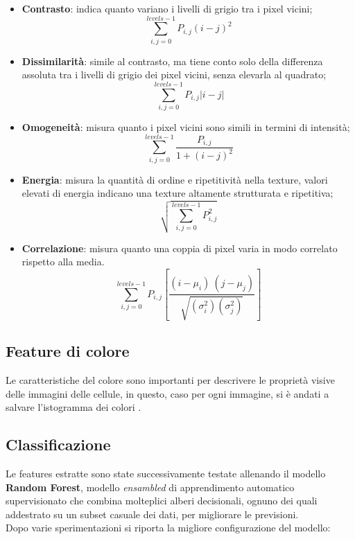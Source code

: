 \documentclass[italian,10pt,a4paper]{article}
\begin{document}
					\begin{itemize}
						
						\item \textbf{Contrasto}: indica quanto variano i livelli di grigio tra i pixel vicini; $$\sum_{i,j=0}^{levels-1} P_{i,j}(i-j)^2$$
						
						\item \textbf{Dissimilarità}: simile al contrasto, ma tiene conto solo della differenza assoluta tra i livelli di grigio dei pixel vicini, senza elevarla al quadrato; $$\sum_{i,j=0}^{levels-1}P_{i,j}|i-j|$$
						
						\item \textbf{Omogeneità}: misura quanto i pixel vicini sono simili in termini di intensità; $$\sum_{i,j=0}^{levels-1}\frac{P_{i,j}}{1+(i-j)^2}$$
						
						\item \textbf{Energia}: misura la quantità di ordine e ripetitività nella texture, valori elevati di energia indicano una texture altamente strutturata e ripetitiva; $$\sqrt{\sum_{i,j=0}^{levels-1} P_{i,j}^2}$$
						
						\item \textbf{Correlazione}: misura quanto una coppia di pixel varia in modo correlato rispetto alla media. $$\sum_{i,j=0}^{levels-1} P_{i,j}\left[\frac{(i-\mu_i) \
							(j-\mu_j)}{\sqrt{(\sigma_i^2)(\sigma_j^2)}}\right]$$
						
					\end{itemize}
					
				\subsection{Feature di colore}
					Le caratteristiche del colore sono importanti per descrivere le proprietà visive delle immagini delle cellule, in questo, caso per ogni immagine, si è andati a salvare l'istogramma dei colori \cite{Baker_2021}.
				 			
		\subsection{Classificazione}
		
			Le features estratte sono state successivamente testate allenando il modello \textbf{Random Forest}, modello \textit{ensambled} di apprendimento automatico supervisionato che combina molteplici alberi decisionali, ognuno dei quali addestrato su un subset casuale dei dati, per migliorare le previsioni.\\ 
			\linebreak
			Dopo varie sperimentazioni si riporta la migliore configurazione del modello:
			
\end{document}
